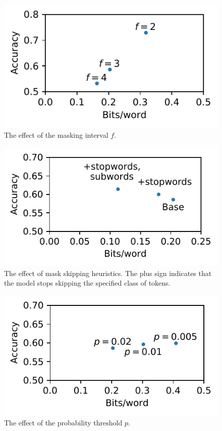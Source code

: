\documentclass[11pt]{article}
\begin{document}
\begin{figure}[t]
    \centering
    \includegraphics[width=0.8\linewidth]{images/mask-ratio.pdf}
    \caption{\label{fig:mask-ratio} 
    The effect of the masking interval $f$.
    }
\end{figure}

\begin{figure}[t]
    \centering
    \includegraphics[width=0.8\linewidth]{images/skip-words.pdf}
    \caption{\label{fig:skip-words} 
    The effect of mask skipping heuristics.
    The plus sign indicates that the model stops skipping the specified class of tokens.
    }
\end{figure}

\begin{figure}[t]
    \centering
    \includegraphics[width=0.8\linewidth]{images/score-threshold.pdf}
    \caption{\label{fig:score-threshold} 
    The effect of the probability threshold $p$.
    }
\end{figure}
\end{document}
